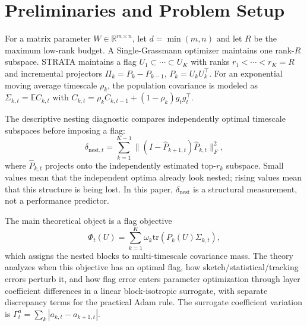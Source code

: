 \section{Preliminaries and Problem Setup}
For a matrix parameter $W\in\mathbb{R}^{m\times n}$, let $d=\min(m,n)$ and let $R$ be the maximum low-rank budget. A Single-Grassmann optimizer maintains one rank-$R$ subspace. STRATA maintains a flag $U_1\subset\cdots\subset U_K$ with ranks $r_1<\cdots<r_K=R$ and incremental projectors $\Pi_k=P_k-P_{k-1}$, $P_k=U_kU_k^\top$. For an exponential moving average timescale $\rho_k$, the population covariance is modeled as $\Sigma_{k,t}=\mathbb{E}C_{k,t}$ with $C_{k,t}=\rho_k C_{k,t-1}+(1-\rho_k)g_tg_t^\top$.

The descriptive nesting diagnostic compares independently optimal timescale subspaces before imposing a flag:
\begin{equation}
\delta_{\mathrm{nest},t}=\sum_{k=1}^{K-1}\|(I-\hat P_{k+1,t})\hat P_{k,t}\|_F^2,
\end{equation}
where $\hat P_{k,t}$ projects onto the independently estimated top-$r_k$ subspace. Small values mean that the independent optima already look nested; rising values mean that this structure is being lost. In this paper, $\delta_{\mathrm{nest}}$ is a structural measurement, not a performance predictor.

The main theoretical object is a flag objective
\begin{equation}
\Phi_t(U)=\sum_{k=1}^K \omega_k \mathrm{tr}(P_k(U)\Sigma_{k,t}),
\end{equation}
which assigns the nested blocks to multi-timescale covariance mass. The theory analyzes when this objective has an optimal flag, how sketch/statistical/tracking errors perturb it, and how flag error enters parameter optimization through layer coefficient differences in a linear block-isotropic surrogate, with separate discrepancy terms for the practical Adam rule. The surrogate coefficient variation is $\Gamma_t^a=\sum_k |a_{k,t}-a_{k+1,t}|$.
